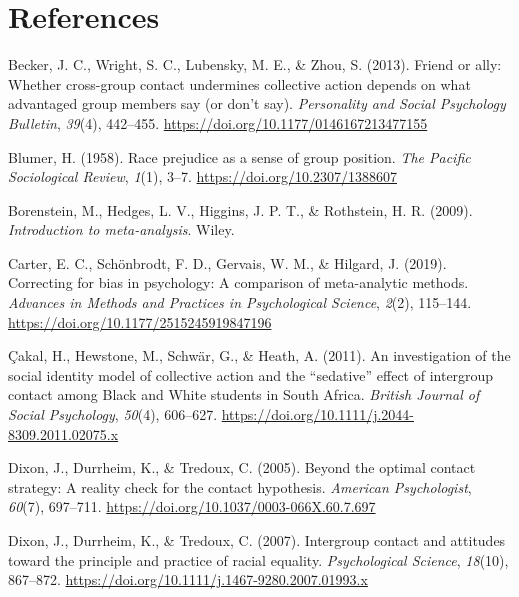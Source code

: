 \documentclass[twocolumn, 11pt, letterpaper]{article}
\begin{document}
\hypertarget{references}{%
\section{References}\label{references}}

\begingroup

\noindent \setlength{\parindent}{-0.5in} \setlength{\leftskip}{0.5in}
\small

\hypertarget{refs}{}
\leavevmode\hypertarget{ref-becker_friend_2013}{}%
Becker, J. C., Wright, S. C., Lubensky, M. E., \& Zhou, S. (2013).
Friend or ally: Whether cross-group contact undermines collective action
depends on what advantaged group members say (or don't say).
\emph{Personality and Social Psychology Bulletin}, \emph{39}(4),
442--455. \url{https://doi.org/10.1177/0146167213477155}

\leavevmode\hypertarget{ref-blumer_race_1958}{}%
Blumer, H. (1958). Race prejudice as a sense of group position.
\emph{The Pacific Sociological Review}, \emph{1}(1), 3--7.
\url{https://doi.org/10.2307/1388607}

\leavevmode\hypertarget{ref-borenstein_introduction_2009}{}%
Borenstein, M., Hedges, L. V., Higgins, J. P. T., \& Rothstein, H. R.
(2009). \emph{Introduction to meta-analysis}. Wiley.

\leavevmode\hypertarget{ref-carter_correcting_2019}{}%
Carter, E. C., Schönbrodt, F. D., Gervais, W. M., \& Hilgard, J. (2019).
Correcting for bias in psychology: A comparison of meta-analytic
methods. \emph{Advances in Methods and Practices in Psychological
Science}, \emph{2}(2), 115--144.
\url{https://doi.org/10.1177/2515245919847196}

\leavevmode\hypertarget{ref-cakal_investigation_2011}{}%
Çakal, H., Hewstone, M., Schwär, G., \& Heath, A. (2011). An
investigation of the social identity model of collective action and the
``sedative'' effect of intergroup contact among Black and White students
in South Africa. \emph{British Journal of Social Psychology},
\emph{50}(4), 606--627.
\url{https://doi.org/10.1111/j.2044-8309.2011.02075.x}

\leavevmode\hypertarget{ref-dixon_beyond_2005}{}%
Dixon, J., Durrheim, K., \& Tredoux, C. (2005). Beyond the optimal
contact strategy: A reality check for the contact hypothesis.
\emph{American Psychologist}, \emph{60}(7), 697--711.
\url{https://doi.org/10.1037/0003-066X.60.7.697}

\leavevmode\hypertarget{ref-dixon_intergroup_2007}{}%
Dixon, J., Durrheim, K., \& Tredoux, C. (2007). Intergroup contact and
attitudes toward the principle and practice of racial equality.
\emph{Psychological Science}, \emph{18}(10), 867--872.
\url{https://doi.org/10.1111/j.1467-9280.2007.01993.x}
\end{document}
